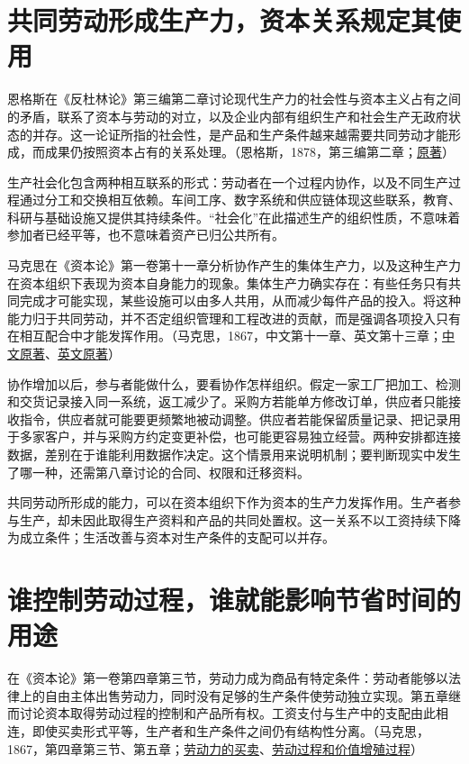\documentclass[UTF8,fontset=windows,12pt,a4paper,oneside,openany]{ctexbook}
\begin{document}
\section{共同劳动形成生产力，资本关系规定其使用}

恩格斯在《反杜林论》第三编第二章讨论现代生产力的社会性与资本主义占有之间的矛盾，联系了资本与劳动的对立，以及企业内部有组织生产和社会生产无政府状态的并存。这一论证所指的社会性，是产品和生产条件越来越需要共同劳动才能形成，而成果仍按照资本占有的关系处理。（恩格斯，1878，第三编第二章；\href{https://www.marxists.org/archive/marx/works/1877/anti-duhring/ch24.htm}{原著}）

生产社会化包含两种相互联系的形式：劳动者在一个过程内协作，以及不同生产过程通过分工和交换相互依赖。车间工序、数字系统和供应链体现这些联系，教育、科研与基础设施又提供其持续条件。“社会化”在此描述生产的组织性质，不意味着参加者已经平等，也不意味着资产已归公共所有。

马克思在《资本论》第一卷第十一章分析协作产生的集体生产力，以及这种生产力在资本组织下表现为资本自身能力的现象。集体生产力确实存在：有些任务只有共同完成才可能实现，某些设施可以由多人共用，从而减少每件产品的投入。将这种能力归于共同劳动，并不否定组织管理和工程改进的贡献，而是强调各项投入只有在相互配合中才能发挥作用。（马克思，1867，中文第十一章、英文第十三章；\href{https://www.marxists.org/chinese/marx-engels/23/021.htm}{中文原著}、\href{https://www.marxists.org/archive/marx/works/1867-c1/ch13.htm}{英文原著}）

协作增加以后，参与者能做什么，要看协作怎样组织。假定一家工厂把加工、检测和交货记录接入同一系统，返工减少了。采购方若能单方修改订单，供应者只能接收指令，供应者就可能要更频繁地被动调整。供应者若能保留质量记录、把记录用于多家客户，并与采购方约定变更补偿，也可能更容易独立经营。两种安排都连接数据，差别在于谁能利用数据作决定。这个情景用来说明机制；要判断现实中发生了哪一种，还需第八章讨论的合同、权限和迁移资料。

共同劳动所形成的能力，可以在资本组织下作为资本的生产力发挥作用。生产者参与生产，却未因此取得生产资料和产品的共同处置权。这一关系不以工资持续下降为成立条件；生活改善与资本对生产条件的支配可以并存。

\section{谁控制劳动过程，谁就能影响节省时间的用途}

在《资本论》第一卷第四章第三节，劳动力成为商品有特定条件：劳动者能够以法律上的自由主体出售劳动力，同时没有足够的生产条件使劳动独立实现。第五章继而讨论资本取得劳动过程的控制和产品所有权。工资支付与生产中的支配由此相连，即使买卖形式平等，生产者和生产条件之间仍有结构性分离。（马克思，1867，第四章第三节、第五章；\href{https://www.marxists.org/chinese/marx-engels/23/014.htm}{劳动力的买卖}、\href{https://www.marxists.org/chinese/marx-engels/23/015.htm}{劳动过程和价值增殖过程}）
\end{document}

